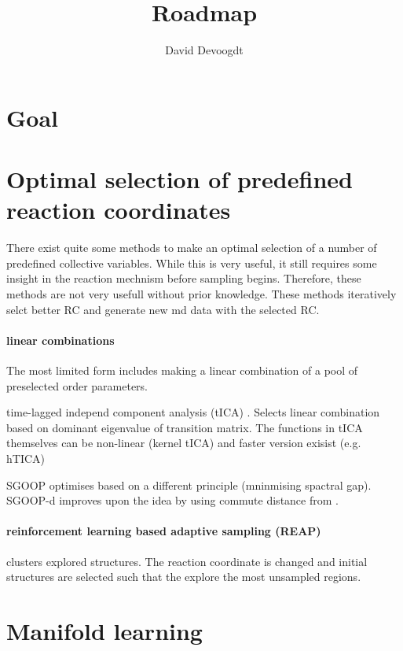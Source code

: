 \documentclass{article}
\title{Roadmap }
\author{David Devoogdt }
\date{}
\begin{document}
\maketitle

\section{Goal}

\section{Optimal selection of predefined reaction coordinates}

There exist quite some methods to make an optimal selection of a number of predefined collective variables. While this is very useful, it still requires some insight in the reaction mechnism before sampling begins. Therefore, these methods are not very usefull without prior knowledge. These methods iteratively selct better RC and generate new md data with the selected RC.

\paragraph{linear combinations} The most limited form includes making a linear combination of a pool of preselected order parameters.

time-lagged independ component analysis (tICA) \cite{Tiwary2016}. Selects linear combination based on dominant eigenvalue of transition matrix. The functions in tICA themselves can be non-linear (kernel tICA) and faster version exisist (e.g. hTICA)

SGOOP \cite{Tiwary2016} optimises based on a different principle (mninmising spactral gap). SGOOP-d improves upon the idea by using commute distance from \cite{noe2016}.

\paragraph{reinforcement learning based adaptive sampling (REAP) } \cite{Shamsi2018} clusters explored structures. The reaction coordinate is changed and initial structures are selected such that the explore the most unsampled regions.

\section{Manifold learning}
\end{document}
